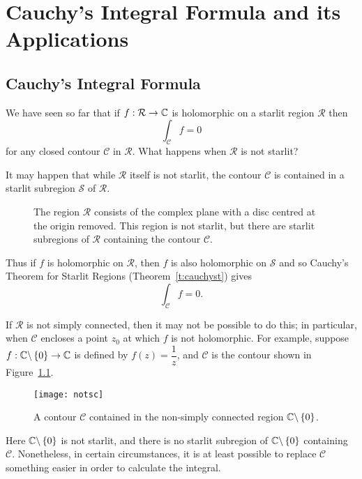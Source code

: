 
\chapter[Cauchy's Integral Formula]{Cauchy's Integral Formula and its Applications}
\section{Cauchy's Integral Formula}
We have seen so far that if $f:\mathcal{R} \to \mathbb{C}$ is holomorphic on a starlit region $\mathcal{R}$ then
\[
\int_{\mathcal{C}} f = 0
\]
for any closed contour $\mathcal{C}$ in $\mathcal{R}$. What happens when $\mathcal{R}$ is not starlit?  

It may happen that while $\mathcal{R}$ itself is not starlit, the contour $\mathcal{C}$ is contained in a starlit subregion $\mathcal{S}$ of $\mathcal{R}$.

\begin{figure}[h]
\caption{The region $\mathcal{R}$ consists of the complex plane with a disc centred at the origin removed.  This region is not starlit, but there are starlit subregions of $\mathcal{R}$ containing the contour $\mathcal{C}$.}
\end{figure}

Thus if $f$ is holomorphic on $\mathcal{R}$, then $f$ is also holomorphic on $\mathcal{S}$ and so Cauchy's Theorem for Starlit Regions (Theorem~\ref{t:cauchyst}) gives
\[
\int_{\mathcal{C}} f=0.
\]


If $\mathcal{R}$ is not simply connected, then it may not be possible to do this; in particular, when $\mathcal{C}$ encloses a point $z_0$ at which $f$ is not holomorphic.  For example, suppose $f:\mathbb{C} \backslash \left\{0\right\} \to \mathbb{C}$ is defined by $f(z) = \dfrac{1}{z}$, and $\mathcal{C}$ is the contour shown in Figure~\ref{f:notsc}.  
\begin{figure}[h]
\centering
\texttt{[image: notsc]}
\caption{A contour $\mathcal{C}$ contained in the non-simply connected region $\mathbb{C}\backslash \left\{0\right\}$.}
\label{f:notsc}
\end{figure}

Here $\mathbb{C} \backslash \left\{0\right\}$ is not starlit, and there is no starlit subregion of $\mathbb{C} \backslash \left\{0\right\}$ containing $\mathcal{C}$.  Nonetheless, in certain circumstances, it is at least possible to replace $\mathcal{C}$ something easier in order to calculate the integral.

